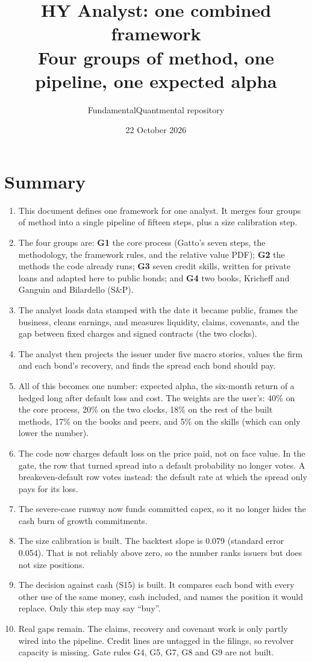 \documentclass[11pt]{article}
\title{HY Analyst: one combined framework\\[2pt]
\large Four groups of method, one pipeline, one expected alpha}
\author{FundamentalQuantmental repository}
\date{22 October 2026}
\newcommand{\GA}{\textcolor{gA}{\textbf{G1}}}
\newcommand{\GB}{\textcolor{gB}{\textbf{G2}}}
\newcommand{\GC}{\textcolor{gC}{\textbf{G3}}}
\newcommand{\GD}{\textcolor{gD}{\textbf{G4}}}
\begin{document}
\maketitle
\thispagestyle{empty}
\section*{Summary}

\begin{enumerate}[leftmargin=1.6em,itemsep=0.3em]
\item This document defines one framework for one analyst. It merges four groups of method into a single pipeline of fifteen steps, plus a size calibration step.
\item The four groups are: \GA{} the core process (Gatto's seven steps, the methodology, the framework rules, and the relative value PDF); \GB{} the methods the code already runs; \GC{} seven credit skills, written for private loans and adapted here to public bonds; and \GD{} two books, Kricheff and Ganguin and Bilardello (S\&P).
\item The analyst loads data stamped with the date it became public, frames the business, cleans earnings, and measures liquidity, claims, covenants, and the gap between fixed charges and signed contracts (the two clocks).
\item The analyst then projects the issuer under five macro stories, values the firm and each bond's recovery, and finds the spread each bond should pay.
\item All of this becomes one number: expected alpha, the six-month return of a hedged long after default loss and cost. The weights are the user's: 40\% on the core process, 20\% on the two clocks, 18\% on the rest of the built methods, 17\% on the books and peers, and 5\% on the skills (which can only lower the number).
\item The code now charges default loss on the price paid, not on face value. In the gate, the row that turned spread into a default probability no longer votes. A breakeven-default row votes instead: the default rate at which the spread only pays for its loss.
\item The severe-case runway now funds committed capex, so it no longer hides the cash burn of growth commitments.
\item The size calibration is built. The backtest slope is 0.079 (standard error 0.054). That is not reliably above zero, so the number ranks issuers but does not size positions.
\item The decision against cash (S15) is built. It compares each bond with every other use of the same money, cash included, and names the position it would replace. Only this step may say ``buy''.
\item Real gaps remain. The claims, recovery and covenant work is only partly wired into the pipeline. Credit lines are untagged in the filings, so revolver capacity is missing. Gate rules G4, G5, G7, G8 and G9 are not built.
\end{enumerate}
\end{document}
